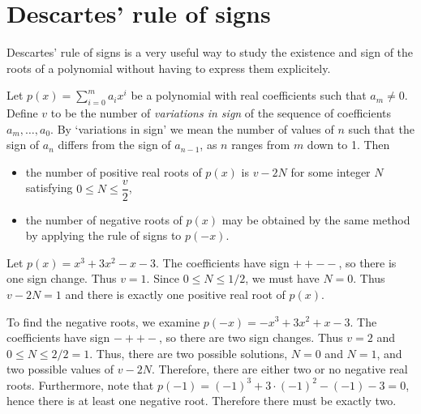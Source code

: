 \chapter{Descartes' rule of signs}
\label{sec:descartes}
Descartes' rule of signs is a very useful way to study the existence and sign of the roots of a polynomial without having to express them explicitely.
\begin{atheorem}\label{th:descartes}
Let $p(x) = \sum_{i=0}^m a_ix^i $ be a polynomial with real coefficients such that $a_m \neq 0$.
Define $v$ to be the number of {\it variations in sign} of the sequence of coefficients $a_m, \ldots, a_0$. By `variations in sign' we mean the number of values of $n$ such that the sign of $a_n$ differs from the sign of $a_{n - 1}$, as $n$ ranges from $m$ down to 1.
Then 
\begin{itemize}
\item the number of positive real roots of $p(x)$ is $v-2N$ for some integer $N$ satisfying $0 \leq N \leq \dfrac{v}{2}$,
\item the number of negative roots of $p(x)$ may be obtained by the same method by applying the rule of signs to $p(-x)$.
\end{itemize}
\end{atheorem}


\begin{example}
Let $p(x) = x^3+3x^2-x-3$. The coefficients have sign $++--$, so there is one sign change.
Thus $v = 1$. Since $0 \leq N \leq 1/2$, we must have $N=0$. Thus $v-2N=1$ and there is exactly one positive real root of $p(x)$.

To find the negative roots, we examine $p(-x) = -x^3+3x^2+x-3$. The coefficients have sign $-++-$, so there are two sign changes. Thus $v=2$ and $0 \leq N \leq 2/2= 1$.
Thus, there are two possible solutions, $N=0$ and $N=1$, and two possible values of $v-2N$. Therefore, there are either two or no negative real roots.
Furthermore, note that $p(-1)=(-1)^3+3 \cdot (-1)^2-(-1)-3=0$, hence there is at least one negative root. Therefore there must be exactly two.
\end{example}


